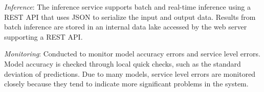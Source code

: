 \textit{Inference}: The inference service supports batch and real-time inference using a REST API that uses JSON to serialize the input and output data. Results from batch inference are stored in an internal data lake accessed by the web server supporting a REST API.

\textit{Monitoring}: Conducted to monitor model accuracy errors and service level errors. Model accuracy is checked through local quick checks, such as the standard deviation of predictions. Due to many models, service level errors are monitored closely because they tend to indicate more significant problems in the system.



